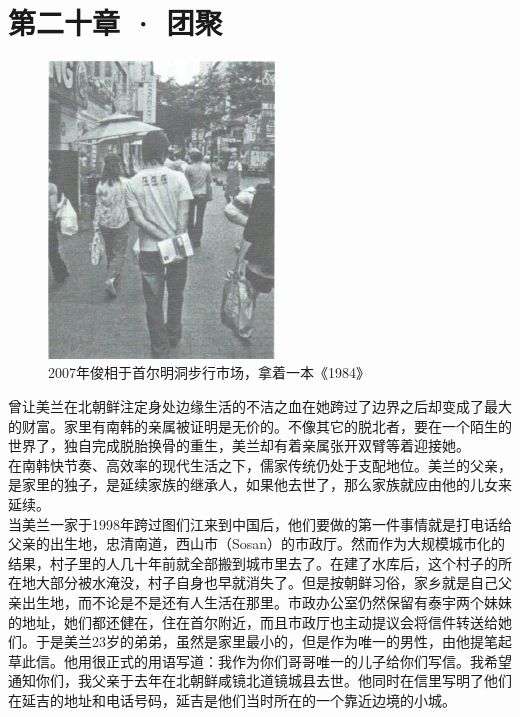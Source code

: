 \fancyhead[RO]{\thepage}
\fancyhead[LE]{\thepage}
\fancyfoot[LE,RO]{}
\fancyfoot[LO,CE]{}
\fancyfoot[CO,RE]{}
\chapter*{第二十章 · 团聚}
\begin{figure}[!htbp]
\centering
\includegraphics[width=6cm]{./Chapters/Images/20.jpg}
\caption*{2007年俊相于首尔明洞步行市场，拿着一本《1984》}
\end{figure}


曾让美兰在北朝鲜注定身处边缘生活的不洁之血在她跨过了边界之后却变成了最大的财富。家里有南韩的亲属被证明是无价的。不像其它的脱北者，要在一个陌生的世界了，独自完成脱胎换骨的重生，美兰却有着亲属张开双臂等着迎接她。\\

在南韩快节奏、高效率的现代生活之下，儒家传统仍处于支配地位。美兰的父亲，是家里的独子，是延续家族的继承人，如果他去世了，那么家族就应由他的儿女来延续。\\

当美兰一家于1998年跨过图们江来到中国后，他们要做的第一件事情就是打电话给父亲的出生地，忠清南道，西山市（Sosan）的市政厅。然而作为大规模城市化的结果，村子里的人几十年前就全部搬到城市里去了。在建了水库后，这个村子的所在地大部分被水淹没，村子自身也早就消失了。但是按朝鲜习俗，家乡就是自己父亲出生地，而不论是不是还有人生活在那里。市政办公室仍然保留有泰宇两个妹妹的地址，她们都还健在，住在首尔附近，而且市政厅也主动提议会将信件转送给她们。于是美兰23岁的弟弟，虽然是家里最小的，但是作为唯一的男性，由他提笔起草此信。他用很正式的用语写道：我作为你们哥哥唯一的儿子给你们写信。我希望通知你们，我父亲于去年在北朝鲜咸镜北道镜城县去世。他同时在信里写明了他们在延吉的地址和电话号码，延吉是他们当时所在的一个靠近边境的小城。\\

